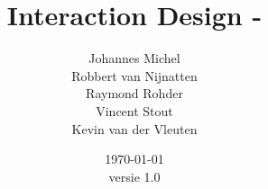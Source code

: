 


\author{Johannes Michel\\Robbert van Nijnatten\\Raymond Rohder\\Vincent Stout\\Kevin van der Vleuten}
\title{Interaction Design - \projectname}
\date{\today \\versie 1.0}



\maketitle

\renewcommand*\contentsname{Inhoud}
\tableofcontents

%










